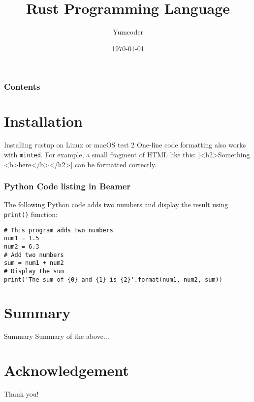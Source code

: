 \documentclass{beamer}
\title[Rust-Lang]{Rust Programming Language}
\author[Yumcoder]{Yumcoder}
\institute[UoT]{University of Toronto}
\date[{\today} ]
{\today}
\begin{document}
\frame{\titlepage}
\begin{frame}
\frametitle{Contents}
\tableofcontents
\end{frame}
\section{Installation}
    \begin{frame}{Installing rustup on Linux or macOS}
    	test 2
    	One-line code formatting also works with \texttt{minted}. For example, a small fragment of HTML like this:
    	|<h2>Something <b>here</b></h2>|
    	\noindent can be formatted correctly.
    \end{frame}

\begin{frame}[fragile]
	\frametitle{Python Code listing in Beamer}
	The following Python code adds two numbers and display the result using \verb|print()| function:
	\scriptsize
	\begin{verbatim}
# This program adds two numbers
num1 = 1.5
num2 = 6.3
# Add two numbers
sum = num1 + num2
# Display the sum
print('The sum of {0} and {1} is {2}'.format(num1, num2, sum))
	\end{verbatim}
\end{frame}

\section{Summary}
    \begin{frame}{Summary}
 Summary of the above...
    \end{frame}

\section*{Acknowledgement}  
\begin{frame}
\Huge{\centerline{Thank you!}}
\end{frame}
\end{document}
